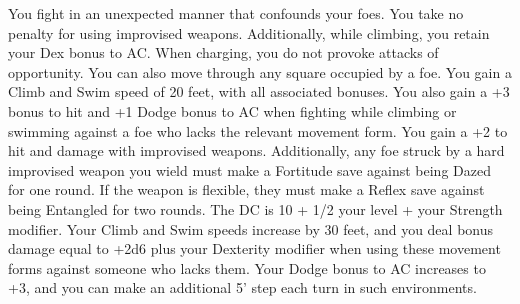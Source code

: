 \begin{multicols}{2}
\label{comm:feat:unorthodoxfighter}{}
{You fight in an unexpected manner that confounds your foes.
}{You take no penalty for using improvised weapons. Additionally, while climbing, you retain your Dex bonus to AC.
}{When charging, you do not provoke attacks of opportunity. You can also move through any square occupied by a foe.
}{You gain a Climb and Swim speed of 20 feet, with all associated bonuses. You also gain a +3 bonus to hit and +1 Dodge bonus to AC when fighting while climbing or swimming against a foe who lacks the relevant movement form.
}{You gain a +2 to hit and damage with improvised weapons. Additionally, any foe struck by a hard improvised weapon you wield must make a Fortitude save against being Dazed for one round. If the weapon is flexible, they must make a Reflex save against being Entangled for two rounds. The DC is 10 + 1/2 your level + your Strength modifier.
}{Your Climb and Swim speeds increase by 30 feet, and you deal bonus damage equal to +2d6 plus your Dexterity modifier when using these movement forms against someone who lacks them. Your Dodge bonus to AC increases to +3, and you can make an additional 5' step each turn in such environments.}

\end{multicols}
